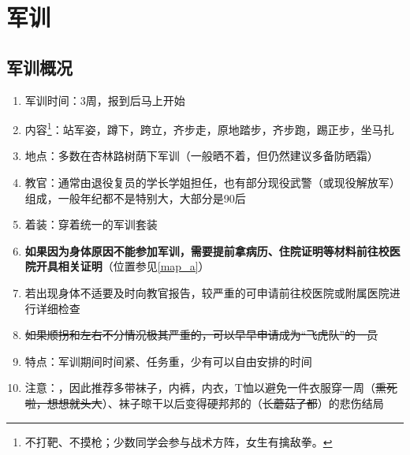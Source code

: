 \chapter[军训]{军训\vspace{-2em}}
\section[军训概况]{军训概况}
\begin{enumerate}
    \item 军训时间：3周，报到后马上开始
    \item 内容\footnote{不打靶、不摸枪；少数同学会参与战术方阵，女生有擒敌拳。}：站军姿，蹲下，跨立，齐步走，原地踏步，齐步跑，踢正步，坐马扎
    \item 地点：多数在杏林路树荫下军训（一般晒不着，但仍然建议多备防晒霜）
    \item 教官：通常由退役复员的学长学姐担任，也有部分现役武警（或现役解放军）组成，一般年纪都不是特别大，大部分是90后
    \item 着装：穿着统一的军训套装\footnotemark
    \item \textbf{如果因为身体原因不能参加军训，需要提前拿病历、住院证明等材料前往校医院开具相关证明\label{exercise_unattend}}（位置参见\uline{\ref{map_a}}）
    \item 若出现身体不适要及时向教官报告，较严重的可申请前往校医院或附属医院进行详细检查
    \item \sout{如果顺拐和左右不分情况极其严重的，可以早早申请成为“飞虎队”\footnotemark 的一员}
    \item 特点：军训期间时间紧、任务重，少有可以自由安排的时间
    \item 注意：\textbf{}，因此推荐多带袜子，内裤，内衣，T恤以避免一件衣服穿一周（\sout{熏死啦，想想就头大}）、袜子晾干以后变得硬邦邦的（\sout{长蘑菇了都}）的悲伤结局
\end{enumerate}

